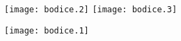 \documentclass[portrait,a0b,final]{a0poster}  %
\begin{document}

\begin{figure}[!htp]
\centering
\subfigure %
{
		\texttt{[image: bodice.2]}
}
\subfigure %
{
		\texttt{[image: bodice.3]}
}

\subfigure %
{
		\texttt{[image: bodice.1]}
}
\end{figure}
\end{document}
